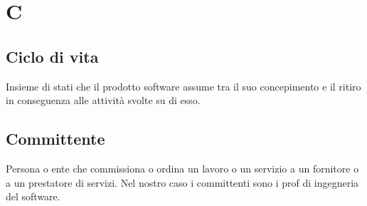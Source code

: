 \section{C}
\subsection{Ciclo di vita}%
Insieme di stati che il prodotto software assume tra il suo concepimento e il ritiro in 
conseguenza alle attività svolte su di esso.
\subsection{Committente}%
Persona o ente che commissiona o ordina un lavoro o un servizio a un fornitore o a un 
prestatore di servizi.
Nel nostro caso i committenti sono i prof di ingegneria del software.
\clearpage